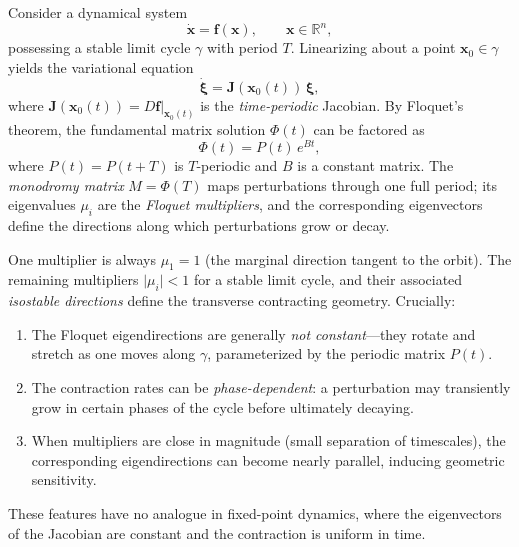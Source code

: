 \documentclass[12pt]{article}
\newcommand{\R}{\mathbb{R}}
\newcommand{\abs}[1]{\lvert #1 \rvert}
\begin{document}
Consider a dynamical system
\begin{equation}
  \dot{\bm{x}} = \bm{f}(\bm{x}), \qquad \bm{x} \in \R^n,
  \label{eq:ode}
\end{equation}
possessing a stable limit cycle $\gamma$ with period $T$. Linearizing about
a point $\bm{x}_0 \in \gamma$ yields the variational equation
\begin{equation}
  \dot{\bm{\xi}} = \bm{J}(\bm{x}_0(t))\,\bm{\xi},
  \label{eq:variational}
\end{equation}
where $\bm{J}(\bm{x}_0(t)) = D\bm{f}|_{\bm{x}_0(t)}$ is the
\emph{time-periodic} Jacobian. By Floquet's theorem, the fundamental matrix
solution $\Phi(t)$ can be factored as
\begin{equation}
  \Phi(t) = P(t) \, e^{Bt},
  \label{eq:floquet}
\end{equation}
where $P(t) = P(t + T)$ is $T$-periodic and $B$ is a constant matrix.
The \emph{monodromy matrix} $M = \Phi(T)$ maps perturbations through one
full period; its eigenvalues $\mu_i$ are the \emph{Floquet multipliers},
and the corresponding eigenvectors define the directions along which
perturbations grow or decay.

One multiplier is always $\mu_1 = 1$ (the marginal direction tangent to
the orbit). The remaining multipliers $\abs{\mu_i} < 1$ for a stable
limit cycle, and their associated \emph{isostable directions}
\citep{wilson2016isostable, kvalheim2021existence} define the transverse
contracting geometry. Crucially:

\begin{enumerate}[label=(\roman*)]
  \item The Floquet eigendirections are generally \emph{not constant}---they
  rotate and stretch as one moves along $\gamma$, parameterized by the
  periodic matrix $P(t)$.
  \item The contraction rates can be \emph{phase-dependent}: a perturbation
  may transiently grow in certain phases of the cycle before ultimately
  decaying.
  \item When multipliers are close in magnitude (small separation of
  timescales), the corresponding eigendirections can become nearly
  parallel, inducing geometric sensitivity.
\end{enumerate}

These features have no analogue in fixed-point dynamics, where the
eigenvectors of the Jacobian are constant and the contraction is uniform
in time.

\end{document}
